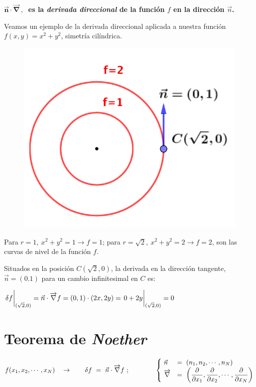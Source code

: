 \vspace{5mm}
\begin{destacado}
	\begin{center} \textbf{$\boldsymbol{\vec n \cdot \overrightarrow {\nabla}} \, , \ $ es la \emph{derivada direccional} de la función $f$ en la dirección $\vec n$.} \end{center}
\end{destacado}

\vspace{5mm}
Veamos un ejemplo de la derivada direccional aplicada a nuestra función $f(x,y)=x^2+y^2$, simetría cilíndrica.

\begin{multicols}{2}
\begin{figure}[H]
	\centering
	\includegraphics[width=.45\textwidth]{imagenes/img15-02.png}
\end{figure}
Para $r=1,\ x^2+y^2=1 \to f=1$; para $r=\sqrt
2,\ x^2+y^2=2 \to f=2$, son las curvas de nivel de la función $f$.

Situados en la posición $C(\sqrt{2},0)$, la derivada en la dirección tangente, $\vec n=(0.1)$ para un cambio infinitesimal en $C$ es:

$\displaystyle \eval{\var f}_{(\sqrt{2},0)}=\vec n \cdot \overrightarrow \nabla f =(0,1)\cdot (2x,2y)=\eval{0+2y}_{(\sqrt{2},0)}=0$
\end{multicols}


\section {Teorema de \emph{Noether}}

\begin{equation}
\label{T15TNtranf}
f(x_1,x_2,\cdots ,x_N) \quad \to \qquad 	\var f \ = \ \vec n \cdot \overrightarrow \nabla f \ ; \qquad 	\qquad 
\begin{cases}
\ \vec n &= \ (n_1,n_2, \cdots, n_N) \\ \ \overrightarrow \nabla &=\ \displaystyle
\left( \pdv{x_1}, \pdv{x_2}, \cdots , \pdv{x_N} \right)	
\end{cases}
\end{equation}

